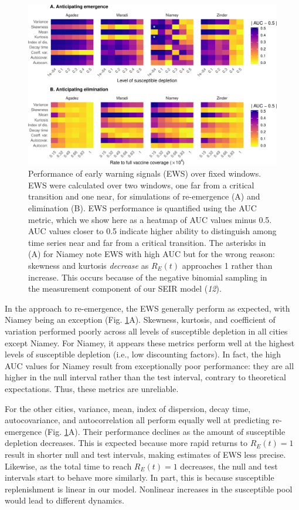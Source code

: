 \documentclass[3p]{elsarticle} %
\makeatletter
\def\maxwidth{\ifdim\Gin@nat@width>\linewidth\linewidth
\else\Gin@nat@width\fi}
\let\Oldincludegraphics\includegraphics
\renewcommand{\includegraphics}[1]{\Oldincludegraphics[width=\maxwidth]{#1}}
\makeatother
\begin{document}
\begin{figure}
\centering
\includegraphics{ms2_files/figure-latex/aucs-1.pdf}
\caption{Performance of early warning signals (EWS) over fixed windows.
EWS were calculated over two windows, one far from a critical transition
and one near, for simulations of re-emergence (A) and elimination (B).
EWS performance is quantified using the AUC metric, which we show here
as a heatmap of AUC values minus 0.5. AUC values closer to 0.5 indicate
higher ability to distinguish among time series near and far from a
critical transition. The asterisks in (A) for Niamey note EWS with high
AUC but for the wrong reason: skewness and kurtosis \emph{decrease} as
\(R_E(t)\) approaches 1 rather than increase. This occurs because of the
negative binomial sampling in the measurement component of our SEIR
model (\emph{12}). \label{aucs}}
\end{figure}

In the approach to re-emergence, the EWS generally perform as expected,
with Niamey being an exception (Fig. \ref{aucs}A). Skewness, kurtosis,
and coefficient of variation performed poorly across all levels of
susceptible depletion in all cities except Niamey. For Niamey, it
appears these metrics perform well at the highest levels of susceptible
depletion (i.e., low discounting factors). In fact, the high AUC values
for Niamey result from exceptionally poor performance: they are all
higher in the null interval rather than the test interval, contrary to
theoretical expectations. Thus, these metrics are unreliable.

For the other cities, variance, mean, index of dispersion, decay time,
autocovariance, and autocorrelation all perform equally well at
predicting re-emergence (Fig. \ref{aucs}A). Their performance declines
as the amount of susceptible depletion decreases. This is expected
because more rapid returns to \(R_E(t)=1\) result in shorter null and
test intervals, making estimates of EWS less precise. Likewise, as the
total time to reach \(R_E(t)=1\) decreases, the null and test intervals
start to behave more similarly. In part, this is because susceptible
replenishment is linear in our model. Nonlinear increases in the
susceptible pool would lead to different dynamics.
\end{document}
